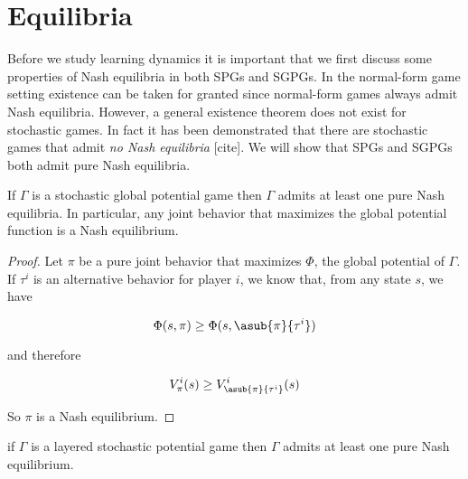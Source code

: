 \section{Equilibria}

Before we study learning dynamics it is important that we first discuss some properties of Nash equilibria in both SPGs and SGPGs. In the normal-form game setting existence can be taken for granted since normal-form games always admit Nash equilibria. However, a general existence theorem does not exist for stochastic games. In fact it has been demonstrated that there are stochastic games that admit {\em no Nash equilibria} [cite]. We will show that SPGs and SGPGs both admit pure Nash equilibria.

\begin{thm}
If $\Gamma$ is a stochastic global potential game then $\Gamma$ admits at least one pure Nash equilibria. In particular, any joint behavior that maximizes the global potential function is a Nash equilibrium.
\end{thm}

\begin{proof}
Let $\pi$ be a pure joint behavior that maximizes $\Phi$, the global potential of $\Gamma$. If $\tau^i$ is an alternative behavior for player $i$, we know that, from any state $s$, we have

$$
\Phi(s, \pi) \geq \Phi(s, \asub{\pi}{\tau^i})
$$

and therefore

$$
V^i_{\pi}(s) \geq V^i_{\asub{\pi}{\tau^i}}(s)
$$

So $\pi$ is a Nash equilibrium.
\end{proof}


\begin{thm}
if $\Gamma$ is a layered stochastic potential game then $\Gamma$ admits at least one pure Nash equilibrium.
\end{thm}

